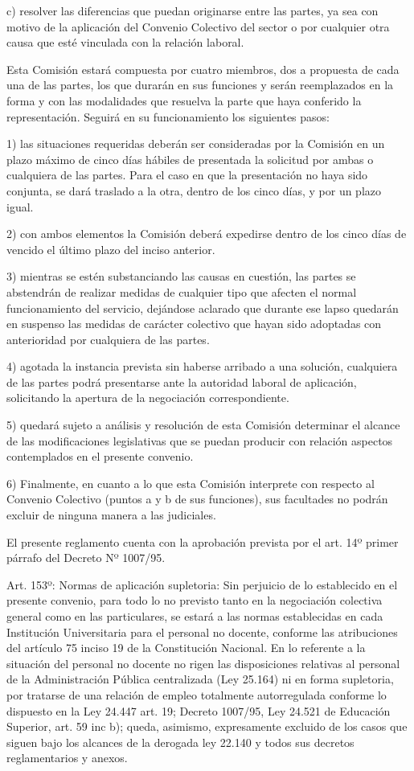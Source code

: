 \documentclass[]{article}
\begin{document}
c) resolver las diferencias que puedan originarse entre las partes, ya
sea con motivo de la aplicación del Convenio Colectivo del sector o por
cualquier otra causa que esté vinculada con la relación laboral.

Esta Comisión estará compuesta por cuatro miembros, dos a propuesta de
cada una de las partes, los que durarán en sus funciones y serán
reemplazados en la forma y con las modalidades que resuelva la parte que
haya conferido la representación. Seguirá en su funcionamiento los
siguientes pasos:

1) las situaciones requeridas deberán ser consideradas por la Comisión
en un plazo máximo de cinco días hábiles de presentada la solicitud por
ambas o cualquiera de las partes. Para el caso en que la presentación no
haya sido conjunta, se dará traslado a la otra, dentro de los cinco
días, y por un plazo igual.

2) con ambos elementos la Comisión deberá expedirse dentro de los cinco
días de vencido el último plazo del inciso anterior.

3) mientras se estén substanciando las causas en cuestión, las partes se
abstendrán de realizar medidas de cualquier tipo que afecten el normal
funcionamiento del servicio, dejándose aclarado que durante ese lapso
quedarán en suspenso las medidas de carácter colectivo que hayan sido
adoptadas con anterioridad por cualquiera de las partes.

4) agotada la instancia prevista sin haberse arribado a una solución,
cualquiera de las partes podrá presentarse ante la autoridad laboral de
aplicación, solicitando la apertura de la negociación correspondiente.

5) quedará sujeto a análisis y resolución de esta Comisión determinar el
alcance de las modificaciones legislativas que se puedan producir con
relación aspectos contemplados en el presente convenio.

6) Finalmente, en cuanto a lo que esta Comisión interprete con respecto
al Convenio Colectivo (puntos a y b de sus funciones), sus facultades no
podrán excluir de ninguna manera a las judiciales.

El presente reglamento cuenta con la aprobación prevista por el art. 14º
primer párrafo del Decreto Nº 1007/95.

Art. 153º: Normas de aplicación supletoria: Sin perjuicio de lo
establecido en el presente convenio, para todo lo no previsto tanto en
la negociación colectiva general como en las particulares, se estará a
las normas establecidas en cada Institución Universitaria para el
personal no docente, conforme las atribuciones del artículo 75 inciso 19
de la Constitución Nacional. En lo referente a la situación del personal
no docente no rigen las disposiciones relativas al personal de la
Administración Pública centralizada (Ley 25.164) ni en forma supletoria,
por tratarse de una relación de empleo totalmente autorregulada conforme
lo dispuesto en la Ley 24.447 art. 19; Decreto 1007/95, Ley 24.521 de
Educación Superior, art. 59 inc b); queda, asimismo, expresamente
excluido de los casos que siguen bajo los alcances de la derogada ley
22.140 y todos sus decretos reglamentarios y anexos.
\end{document}
